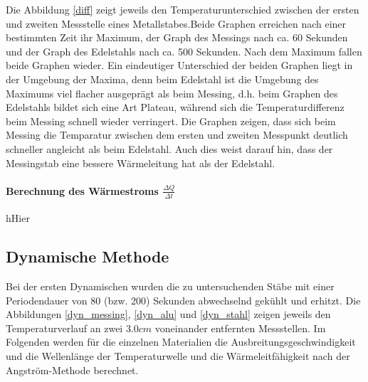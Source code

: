 \documentclass[11pt]{article}
\begin{document}
Die Abbildung \ref{diff} zeigt jeweils den Temperaturunterschied zwischen der ersten und zweiten Messstelle eines Metallstabes.Beide Graphen erreichen nach einer bestimmten Zeit ihr Maximum, der Graph des Messings nach ca. 60 Sekunden und der Graph des Edelstahls nach ca. 500 Sekunden. Nach dem Maximum fallen beide Graphen wieder. Ein eindeutiger Unterschied der beiden Graphen liegt in der Umgebung der Maxima, denn beim Edelstahl ist die Umgebung des Maximums viel flacher ausgeprägt als beim Messing, d.h. beim Graphen des Edelstahls bildet sich eine Art Plateau, während sich die Temperaturdifferenz beim Messing schnell wieder verringert. Die Graphen zeigen, dass sich beim Messing die Temparatur zwischen dem ersten und zweiten Messpunkt deutlich schneller angleicht als beim Edelstahl. Auch dies weist darauf hin, dass der Messingstab eine bessere Wärmeleitung hat als der Edelstahl.
\paragraph{Berechnung des Wärmestroms $\frac{\Delta Q}{\Delta t}$} hHier


\subsection{Dynamische Methode}
Bei der ersten Dynamischen wurden die zu untersuchenden St\"abe mit einer Periodendauer von 80 (bzw. 200)  Sekunden abwechselnd gek\"uhlt und erhitzt. Die Abbildungen \ref{dyn_messing}, \ref{dyn_alu} und \ref{dyn_stahl} zeigen jeweils den Temperaturverlauf an zwei 3.0$cm$ voneinander entfernten Messstellen. Im Folgenden werden f\"ur die einzelnen Materialien die Ausbreitungsgeschwindigkeit und die Wellenl\"ange der Temperaturwelle und die W\"armeleitf\"ahigkeit nach der Angstr\"om-Methode berechnet.
\end{document}
